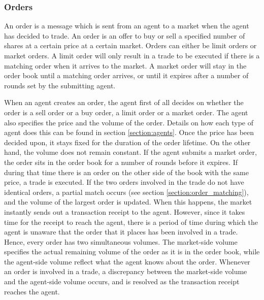 \subsubsection{Orders}
An order is a message which is sent from an agent to a market when the agent has decided to trade. An order is an offer to buy or sell a specified number of shares at a certain price at a certain market. Orders can either be limit orders or market orders. A limit order will only result in a trade to be executed if there is a matching order when it arrives to the market. A market order will stay in the order book until a matching order arrives, or until it expires after a number of rounds set by the submitting agent. 

When an agent creates an order, the agent first of all decides on whether the order is a sell order or a buy order, a limit order or a market order. The agent also specifies the price and the volume of the order. Details on how each type of agent does this can be found in section \ref{section:agents}. Once the price has been decided upon, it stays fixed for the duration of the order lifetime. On the other hand, the volume does not remain constant. If the agent submits a market order, the order sits in the order book for a number of rounds before it expires. If during that time there is an order on the other side of the book with the same price, a trade is executed. If the two orders involved in the trade do not have identical orders, a partial match occurs (see section \ref{section:order_matching}), and the volume of the largest order is updated. When this happens, the market instantly sends out a transaction receipt to the agent. However, since it takes time for the receipt to reach the agent, there is a period of time during which the agent is unaware that the order that it places has been involved in a trade. Hence, every order has two simultaneous volumes. The market-side volume specifies the actual remaining volume of the order as it is in the order book, while the agent-side volume reflect what the agent knows about the order. Whenever an order is involved in a trade, a discrepancy between the market-side volume and the agent-side volume occurs, and is resolved as the transaction receipt reaches the agent. 


